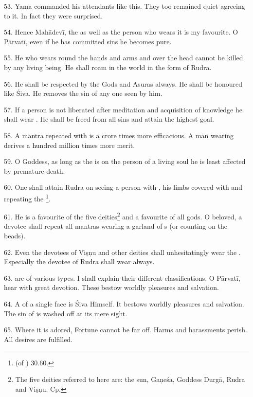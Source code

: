 53. Yama commanded his attendants like this. They too remained quiet agreeing
to it. In fact they were surprised.

54. Hence Mahādevī, the  as well as the person who wears it is my
favourite. O Pārvatī, even if he has committed sins he becomes pure.

55. He who wears  round the hands and arms and over the head cannot
be killed by any living being. He shall roam in the world in the form of Rudra.

56. He shall be respected by the Gods and Asuras always. He shall be honoured
like Śiva. He removes the sin of any one seen by him.

57. If a person is not liberated after meditation and acquisition of knowledge
he shall wear . He shall be freed from all sins and attain
the highest goal.

58. A mantra repeated with  is a crore times more efficacious.
A man wearing  derives a hundred million times more merit.

59. O Goddess, as long as the  is on the person of a living soul he
is least affected by premature death.

60. One shall attain Rudra on seeing a person with , his limbs
covered with  and repeating the 
\footnote{ (of ) 30.60.}.

61. He is a favourite of the five deities\footnote{The five deities referred to
here are: the sun, Gaṇeśa, Goddess Durgā, Rudra and Viṣṇu. Cp. } and a favourite of all gods. O beloved, a devotee shall repeat all
mantras wearing a garland of s (or counting on the beads).

62. Even the devotees of Viṣṇu and other deities shall unhesitatingly wear
the . Especially the devotee of Rudra shall wear 
always.

63.  are of various types. I shall explain their different
classifications. O Pārvatī, hear with great devotion. These 
bestow worldly pleasures and salvation.

64. A  of a single face is Śiva Himself. It bestows worldly
pleasures and salvation. The sin of  is washed off at
its mere sight.

65. Where it is adored, Fortune cannot be far off. Harms and harassments perish.
All desires are fulfilled.

